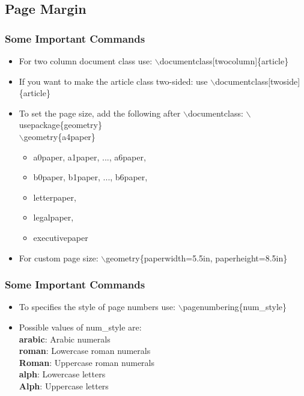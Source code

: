 \documentclass [9pt] {beamer}
\begin{document}
\subsection{Page Margin}\label{Page Margin}
\begin{frame}\frametitle{Some Important Commands}
\rm
\fontsize{9pt}{11pt}\selectfont
\begin{itemize}
\item  For two column document class use: \textcolor[rgb]{0.98,0.00,0.00}{$\backslash$documentclass[twocolumn]\{article\}}\\[.20cm]

\item  If you want to make the article class two-sided: use \textcolor[rgb]{0.98,0.00,0.00}{$\backslash$documentclass[twoside]\{article\}}\\[.20cm]

\item To set the page size, add the following after \textcolor[rgb]{0.98,0.00,0.00}{$\backslash$documentclass}: \textcolor[rgb]{0.98,0.00,0.00}{$\backslash$usepackage\{geometry\}}\\[.20cm]
\textcolor[rgb]{0.98,0.00,0.00}{$\backslash$geometry\{a4paper\}}\\[.20cm]
    \begin{itemize}
      \item a0paper, a1paper, ..., a6paper,
      \item b0paper, b1paper, ..., b6paper,
      \item letterpaper,
      \item legalpaper,
      \item executivepaper
    \end{itemize}
\item For custom page size: \textcolor[rgb]{0.98,0.00,0.00}{$\backslash$geometry\{paperwidth=5.5in, paperheight=8.5in\}}
 \end{itemize}
\end{frame}

\begin{frame}\frametitle{Some Important Commands}
\rm
\fontsize{9pt}{11pt}\selectfont
\begin{itemize}
\item  To specifies the style of page numbers use: \textcolor[rgb]{0.98,0.00,0.00}{$\backslash$pagenumbering\{num\_style\}}\\[.20cm]
\item Possible values of num\_style are:\\[.20cm]
    \textbf{arabic}: Arabic numerals\\[.20cm]
    \textbf{roman}: Lowercase roman numerals\\[.20cm]
    \textbf{Roman}: Uppercase roman numerals\\[.20cm]
    \textbf{alph}: Lowercase letters\\[.20cm]
    \textbf{Alph}: Uppercase letters
\end{itemize}
\end{frame}
\end{document}

